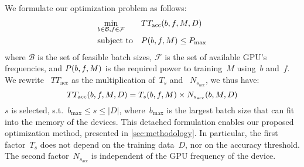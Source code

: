 We formulate our optimization problem as follows:
\begin{equation}
    \begin{aligned}
        & \underset{b\in\mathcal{B}, f\in\mathcal{F}}{\text{min}}
        & & TT_{\text{acc}}(b, f, M, D) \\
        & \text{subject to}
        & & P(b, f, M) \leq P_{\text{max}}
    \end{aligned}
\label{eq:optimization}
\end{equation}
where $\mathcal{B}$ is the set of feasible batch sizes, $\mathcal{F}$ is the set of available GPU's frequencies, and $P(b, f, M)$ is the required power to training~$M$ using~$b$ and~$f$. We rewrite ~$TT_{\text{acc}}$ as the multiplication of~$T_{s}$ and ~$N_{{s}_{\text{acc}}}$, we thus have:
\begin{equation}
    TT_{\text{acc}}(b, f, M, D) = T_{s}(b, f, M) \times  N_{{s}_{\text{acc}}}(b, M, D)
    \label{eq:time_to_acc2}
\end{equation}
$s$ is selected, s.t.~$b_{\text{max}} \leq s \leq |D|$, where~$b_{\text{max}}$ is the largest batch size that can fit into the memory of the devices. 
This detached formulation enables our proposed optimization method, presented in \cref{sec:methodology}.
In particular, the first factor~$T_{s}$ does not depend on the training data~$D$, nor on the accuracy threshold. The second factor~$N_{{s}_\text{acc}}$ is independent of the GPU frequency of the device.


